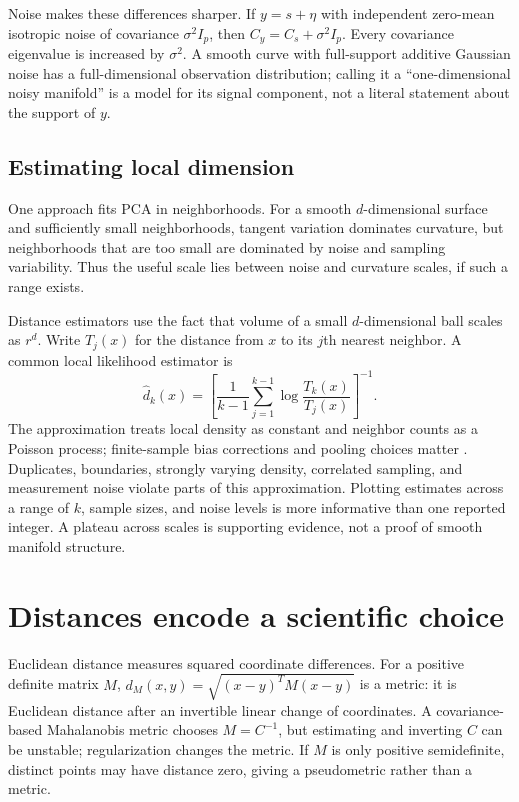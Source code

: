 Noise makes these differences sharper. If $y=s+\eta$ with independent zero-mean isotropic noise of covariance $\sigma^2I_p$, then $C_y=C_s+\sigma^2I_p$. Every covariance eigenvalue is increased by $\sigma^2$. A smooth curve with full-support additive Gaussian noise has a full-dimensional observation distribution; calling it a ``one-dimensional noisy manifold'' is a model for its signal component, not a literal statement about the support of $y$.

\subsection{Estimating local dimension}
One approach fits PCA in neighborhoods. For a smooth $d$-dimensional surface and sufficiently small neighborhoods, tangent variation dominates curvature, but neighborhoods that are too small are dominated by noise and sampling variability. Thus the useful scale lies between noise and curvature scales, if such a range exists.

Distance estimators use the fact that volume of a small $d$-dimensional ball scales as $r^d$. Write $T_j(x)$ for the distance from $x$ to its $j$th nearest neighbor. A common local likelihood estimator is
\begin{equation}\label{eq:local-dimension}
\widehat d_k(x)=\left[\frac{1}{k-1}\sum_{j=1}^{k-1}\log\frac{T_k(x)}{T_j(x)}\right]^{-1}.
\end{equation}
The approximation treats local density as constant and neighbor counts as a Poisson process; finite-sample bias corrections and pooling choices matter \citep{levina2004}. Duplicates, boundaries, strongly varying density, correlated sampling, and measurement noise violate parts of this approximation. Plotting estimates across a range of $k$, sample sizes, and noise levels is more informative than one reported integer. A plateau across scales is supporting evidence, not a proof of smooth manifold structure.

\section{Distances encode a scientific choice}
Euclidean distance measures squared coordinate differences. For a positive definite matrix $M$, $d_M(x,y)=\sqrt{(x-y)^TM(x-y)}$ is a metric: it is Euclidean distance after an invertible linear change of coordinates. A covariance-based Mahalanobis metric chooses $M=C^{-1}$, but estimating and inverting $C$ can be unstable; regularization changes the metric. If $M$ is only positive semidefinite, distinct points may have distance zero, giving a pseudometric rather than a metric.

